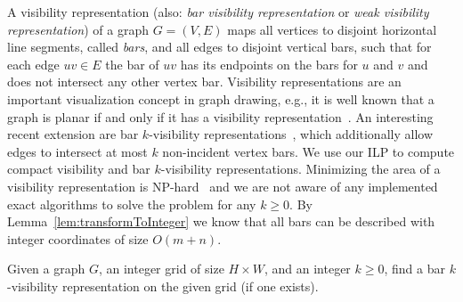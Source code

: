 \documentclass[runningheads]{llncs}
\begin{document}
A visibility representation (also: \emph{bar visibility representation} or \emph{weak visibility representation}) of a graph $G=(V,E)$ maps all vertices to disjoint horizontal line segments, called \emph{bars}, and all edges to disjoint vertical bars, such that for each edge $uv \in E$ the bar of $uv$ has its endpoints on the bars for $u$ and $v$ and does not intersect any other vertex bar. Visibility representations are an important visualization concept in graph drawing, e.g., it is well known that a graph is planar if and only if it has a visibility representation~\cite{Wis85,TT86}.
An interesting recent extension are bar $k$-visibility representations~\cite{deglst-bkvg-07}, which additionally allow edges to intersect at most $k$ non-incident vertex bars. We use our ILP to compute compact visibility and bar $k$-visibility representations. Minimizing the area of a visibility representation is NP-hard~\cite{le-tardhpg-03} and we are not aware of any implemented exact algorithms to solve the problem for any $k\ge 0$. 
By Lemma~\ref{lem:transformToInteger} we
know that all bars can be described with integer coordinates of size $O(m+n)$.

\begin{problem}\label{pb:barvis}
	Given a graph $G$, an integer grid of size $H\times W$, and an integer $k\ge 0$, find a bar $k$-visibility representation on the given grid (if one exists).
\end{problem}
\end{document}
